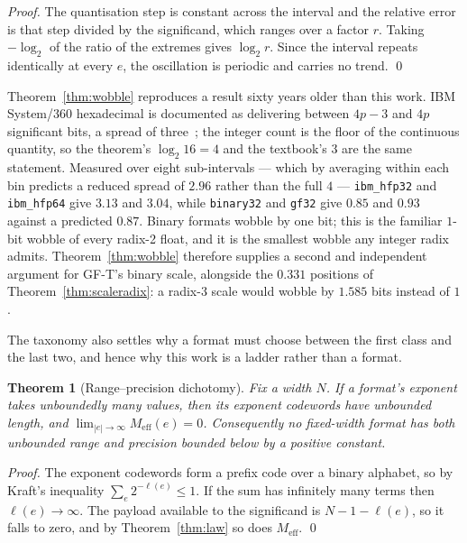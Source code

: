 \documentclass[11pt]{article}
\newtheorem{theorem}{Theorem}
\theoremstyle{definition}
\begin{document}
\begin{proof}
The quantisation step is constant across the interval and the relative error is
that step divided by the significand, which ranges over a factor $r$. Taking
$-\log_2$ of the ratio of the extremes gives $\log_2 r$. Since the interval
repeats identically at every $e$, the oscillation is periodic and carries no
trend. \qed
\end{proof}

Theorem~\ref{thm:wobble} reproduces a result sixty years older than this work.
IBM System/360 hexadecimal is documented as delivering between $4p-3$ and $4p$
significant bits, a spread of three~\cite{goldberg1991,ibmhfp}; the integer count
is the floor of the continuous quantity, so the theorem's $\log_2 16 = 4$ and the
textbook's $3$ are the same statement. Measured over eight sub-intervals ---
which by averaging within each bin predicts a reduced spread of $2.96$ rather than
the full $4$ --- \texttt{ibm\_hfp32} and \texttt{ibm\_hfp64} give $3.13$ and
$3.04$, while \texttt{binary32} and \texttt{gf32} give $0.85$ and $0.93$ against a
predicted $0.87$. Binary formats wobble by one bit; this is the familiar
$1$-bit wobble of every radix-2 float, and it is the smallest wobble any integer
radix admits. Theorem~\ref{thm:wobble} therefore supplies a second and independent
argument for GF-T's binary scale, alongside the $0.331$ positions of
Theorem~\ref{thm:scaleradix}: a radix-3 scale would wobble by $1.585$ bits
instead of $1$.

The taxonomy also settles why a format must choose between the first class and the
last two, and hence why this work is a ladder rather than a format.

\begin{theorem}[Range--precision dichotomy]
\label{thm:dichotomy}
Fix a width $N$. If a format's exponent takes unboundedly many values, then its
exponent codewords have unbounded length, and
$\lim_{|e| \to \infty} M_{\mathrm{eff}}(e) = 0$. Consequently no fixed-width
format has both unbounded range and precision bounded below by a positive
constant.
\end{theorem}

\begin{proof}
The exponent codewords form a prefix code over a binary alphabet, so by Kraft's
inequality $\sum_{e} 2^{-\ell(e)} \leq 1$. If the sum has infinitely many terms
then $\ell(e) \to \infty$. The payload available to the significand is
$N - 1 - \ell(e)$, so it falls to zero, and by Theorem~\ref{thm:law} so does
$M_{\mathrm{eff}}$. \qed
\end{proof}
\end{document}
